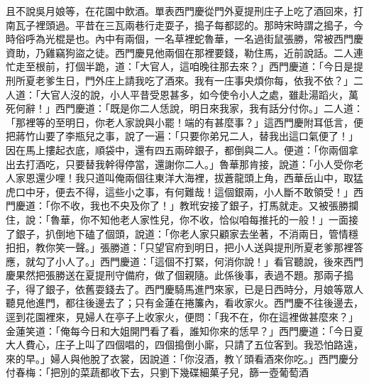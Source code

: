 \begin{showcontents}{}
且不說吳月娘等，在花園中飲酒。單表西門慶從門外夏提刑庄子上吃了酒回來，打南瓦子裡頭過。平昔在三瓦兩巷行走耍子，搗子每都認的。那時宋時謂之搗子，今時俗呼為光棍是也。內中有兩個，一名草裡蛇魯華，一名過街鼠張勝，常被西門慶資助，乃雞竊狗盜之徒。西門慶見他兩個在那裡要錢，勒住馬，近前說話。二人連忙走至根前，打個半跪，道：「大官人，這咱晚往那去來？」西門慶道：「今日是提刑所夏老爹生日，門外庄上請我吃了酒來。我有一庄事央煩你每，依我不依？」二人道：「大官人沒的說，小人平昔受恩甚多，如今使令小人之處，雖赴湯蹈火，萬死何辭！」西門慶道：「既是你二人恁說，明日來我家，我有話分付你。」二人道：「那裡等的至明日，你老人家說與小罷！端的有甚麼事？」這西門慶附耳低言，便把蔣竹山要了李瓶兒之事，說了一遍：「只要你弟兄二人，替我出這口氣便了！」因在馬上摟起衣底，順袋中，還有四五兩碎銀子，都倒與二人。便道：「你兩個拿出去打酒吃，只要替我幹得停當，還謝你二人。」魯華那肯接，說道：「小人受你老人家恩還少哩！我只道叫俺兩個往東洋大海裡，拔蒼龍頭上角，西華岳山中，取猛虎口中牙，便去不得，這些小之事，有何難哉！這個銀兩，小人斷不敢領受！」西門慶道：「你不收，我也不央及你了！」教玳安接了銀子，打馬就走。又被張勝攔住，說：「魯華，你不知他老人家性兒，你不收，恰似咱每推托的一般！」一面接了銀子，扒倒地下磕了個頭，說道：「你老人家只顧家去坐著，不消兩日，管情穩抇抇，教你笑一聲。」張勝道：「只望官府到明日，把小人送與提刑所夏老爹那裡答應，就勾了小人了。」西門慶道：「這個不打緊，何消你說！」看官聽說，後來西門慶果然把張勝送在夏提刑守備府，做了個親隨。此係後事，表過不題。那兩子搗子，得了銀子，依舊耍錢去了。西門慶騎馬進門來家，已是日西時分，月娘等眾人聽見他進門，都往後邊去了；只有金蓮在捲簾內，看收家火。西門慶不往後邊去，逕到花園裡來，見婦人在亭子上收家火，便問：「我不在，你在這裡做甚麼來？」金蓮笑道：「俺每今日和大姐開門看了看，誰知你來的恁早？」西門慶道：「今日夏大人費心，庄子上叫了四個唱的，四個搗倒小廝，只請了五位客到。我恐怕路遠，來的早。」婦人與他脫了衣裳，因說道：「你沒酒，教丫頭看酒來你吃。」西門慶分付春梅：「把別的菜蔬都收下去，只劉下幾碟細菓子兒，篩一壺葡萄酒 
\end{showcontents}
